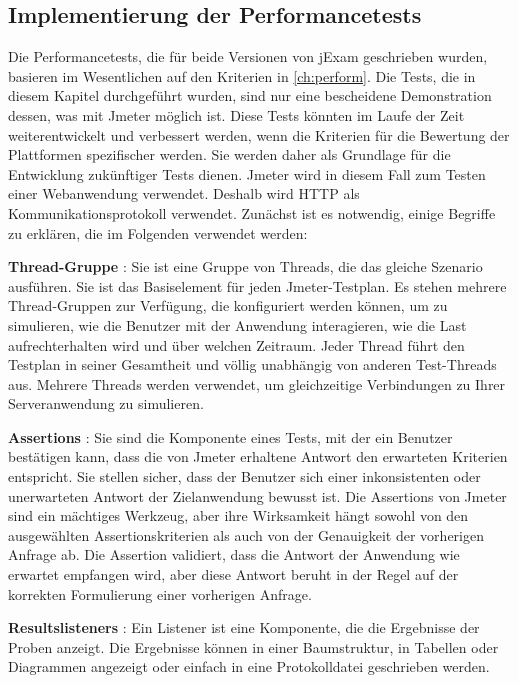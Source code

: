 \subsection{Implementierung der Performancetests}

Die Performancetests, die für beide Versionen von jExam geschrieben wurden,
basieren im Wesentlichen auf den Kriterien in  \autoref{ch:perform}. Die Tests, die
in diesem Kapitel durchgeführt wurden, sind nur eine bescheidene Demonstration
dessen, was mit Jmeter möglich ist. Diese Tests könnten im Laufe der Zeit
weiterentwickelt und verbessert werden, wenn die Kriterien für die Bewertung
der Plattformen spezifischer werden. Sie werden daher als Grundlage für die
Entwicklung zukünftiger Tests dienen. Jmeter wird in diesem Fall zum Testen
einer Webanwendung verwendet. Deshalb wird HTTP als Kommunikationsprotokoll
verwendet. Zunächst ist es notwendig, einige Begriffe zu erklären, die im
Folgenden verwendet werden:

\textbf{Thread-Gruppe} : Sie ist eine Gruppe von Threads, die das gleiche
Szenario ausführen. Sie ist das Basiselement für jeden Jmeter-Testplan. Es
stehen mehrere Thread-Gruppen zur Verfügung, die konfiguriert werden können,
um zu simulieren, wie die Benutzer mit der Anwendung interagieren, wie die
Last aufrechterhalten wird und über welchen Zeitraum. Jeder Thread führt
den Testplan in seiner Gesamtheit und völlig unabhängig von anderen
Test-Threads aus. Mehrere Threads werden verwendet, um gleichzeitige
Verbindungen zu Ihrer Serveranwendung zu simulieren.

\textbf{Assertions} : Sie sind die Komponente eines Tests, mit der ein
Benutzer bestätigen kann, dass die von Jmeter erhaltene Antwort den
erwarteten Kriterien entspricht. Sie stellen sicher, dass der Benutzer sich
einer inkonsistenten oder unerwarteten Antwort der Zielanwendung bewusst
ist. Die Assertions von Jmeter sind ein mächtiges Werkzeug, aber ihre
Wirksamkeit hängt sowohl von den ausgewählten Assertionskriterien als auch
von der Genauigkeit der vorherigen Anfrage ab. Die Assertion validiert, dass
die Antwort der Anwendung wie erwartet empfangen wird, aber diese Antwort
beruht in der Regel auf der korrekten Formulierung einer vorherigen Anfrage.


\textbf{Resultslisteners} : Ein Listener ist eine Komponente, die die
Ergebnisse der Proben anzeigt. Die Ergebnisse können in einer Baumstruktur,
in Tabellen oder Diagrammen angezeigt oder einfach in eine Protokolldatei
geschrieben werden.


